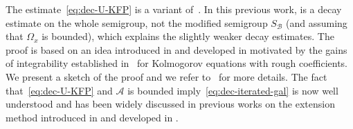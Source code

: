 \documentclass[11pt]{amsart}
\theoremstyle{definition}
\theoremstyle{remark}
\numberwithin{equation}{section}
\def\AA{{\mathcal A}}
\def\BB{{\mathcal B}}
\begin{document}
The estimate~\eqref{eq:dec-U-KFP} is a variant of~\cite[Theorem 1.3]{carrapatoso2024KR}. In this previous work, \cite[Theorem 1.3]{carrapatoso2024KR} is a decay estimate on the whole semigroup, not the modified semigroup $S_\BB$ (and assuming that $\Omega_x$ is bounded), which explains the slightly weaker decay estimates. The proof is based on an idea introduced in \cite{MR1166050,MR3591133,sanchez2024KR} and developed in \cite{carrapatoso2024KFP,carrapatoso2024landau,carrapatoso2024KR,sanchez2024voltage} motivated by the gains of integrability established in~\cite{MR2068847,MR3923847} for Kolmogorov equations with rough coefficients. We present a sketch of the proof and we refer to~\cite{carrapatoso2024KFP,carrapatoso2024landau,carrapatoso2024KR,sanchez2024voltage} for more details. The fact that~\eqref{eq:dec-U-KFP} and $\AA$ is bounded imply~\eqref{eq:dec-iterated-gal} is now well understood and has been widely discussed in previous works on the extension method introduced in \cite{MR2197542} and developed in \cite{MR3779780,MisMou,MR3465438}.
\end{document}
